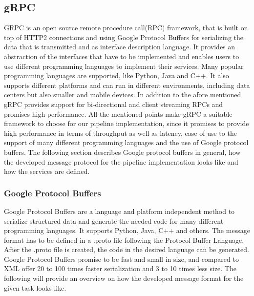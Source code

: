 \subsection{gRPC}
GRPC is an open source remote procedure call(RPC) framework, that is built on top of HTTP2 connections and using Google Protocol Buffers for serializing the data that is transmitted and as interface description language. It provides an abstraction of the interfaces that have to be implemented and enables users to use different programming languages to implement their services. Many popular programming languages are supported, like Python, Java and C++. It also supports different platforms and can run in different environments, including data centers but also smaller and mobile devices. In addition to the afore mentioned gRPC provides support for bi-directional and client streaming RPCs and promises high performance. All the mentioned points make gRPC a suitable framework to choose for our pipeline implementation, since it promises to provide high performance in terms of throughput as well as latency, ease of use to the support of many different programming languages and the use of Google protocol buffers. The following section describes Google protocol buffers in general, how the developed message protocol for the pipeline implementation looks like and how the services are defined.
\subsubsection{Google Protocol Buffers}
 Google Protocol Buffers are a language and platform independent method to serialize structured data and generate the needed code for many different programming languages. It supports Python, Java, C++ and others. The message format has to be defined in a .proto file following the Protocol Buffer Language. After the .proto file is created, the code in the desired language can be generated. Google Protocol Buffers promise to be fast and small in size, and compared to XML offer 20 to 100 times faster serialization and 3 to 10 times less size.
 The following will provide an overview on how the developed message format for the given task looks like.

